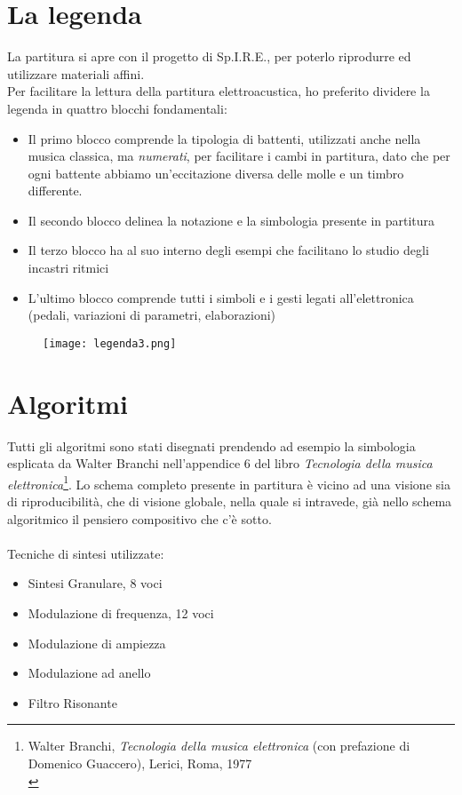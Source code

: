 \section{La legenda}
La partitura si apre con il progetto di Sp.I.R.E., per poterlo riprodurre ed utilizzare materiali affini.\\
Per facilitare la lettura della partitura elettroacustica, ho preferito dividere la legenda in quattro blocchi fondamentali:
\begin{itemize}
\item{Il primo blocco comprende la tipologia di battenti, utilizzati anche nella musica classica, ma \textit{numerati}, per facilitare i cambi in partitura, dato che per ogni battente abbiamo un'eccitazione diversa delle molle e un timbro differente.}
\item{Il secondo blocco delinea la notazione e la simbologia presente in partitura}
\item{Il terzo blocco ha al suo interno degli esempi che facilitano lo studio degli incastri ritmici}
\item{L'ultimo blocco comprende tutti i simboli e i gesti legati all'elettronica (pedali, variazioni di parametri, elaborazioni)}
\end{itemize}

 \begin{figure}[htbp]
        \centering
        \texttt{[image: legenda3.png]}
\end{figure}


\section{Algoritmi}

Tutti gli algoritmi sono stati disegnati prendendo ad esempio la simbologia esplicata da Walter Branchi nell'appendice 6 del libro \textit{Tecnologia della musica elettronica}\footnote{Walter Branchi, \textit{Tecnologia della musica elettronica} (con prefazione di Domenico Guaccero), Lerici, Roma, 1977 \\}. Lo schema completo presente in partitura è vicino ad una visione sia di riproducibilità, che di visione globale, nella quale si intravede, già nello schema algoritmico il pensiero compositivo che c'è sotto. \\
\\
Tecniche di sintesi utilizzate:
	\begin{itemize}
\item{Sintesi Granulare, 8 voci}
\item{Modulazione di frequenza, 12 voci}
\item{Modulazione di ampiezza}
\item{Modulazione ad anello}
\item{Filtro Risonante}
	\end{itemize}


